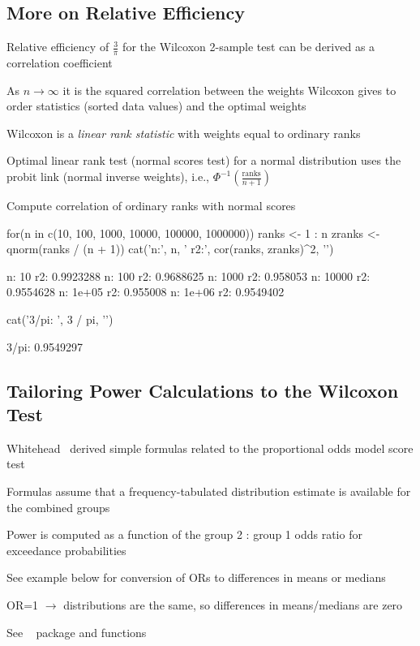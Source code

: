 \subsection{More on Relative Efficiency}
\bi
\item Relative efficiency of $\frac{3}{\pi}$ for the Wilcoxon 2-sample test can be derived as a correlation coefficient
\item As $n \rightarrow \infty$ it is the squared correlation between the weights Wilcoxon gives to order statistics (sorted data values) and the optimal weights
\item Wilcoxon is a \emph{linear rank statistic} with weights equal to ordinary ranks
\item Optimal linear rank test (normal scores test) for a normal distribution uses the probit link (normal inverse weights), i.e., $\Phi^{-1}(\frac{\textrm{ranks}}{n+1})$
\item Compute correlation of ordinary ranks with normal scores
\begin{Schunk}
\begin{Sinput}
for(n in c(10, 100, 1000, 10000, 100000, 1000000)) {
  ranks  <- 1 : n
  zranks <- qnorm(ranks / (n + 1))
  cat('n:', n, '  r2:', cor(ranks, zranks)^2, '\n')
}
\end{Sinput}
\begin{Soutput}
n: 10   r2: 0.9923288 
n: 100   r2: 0.9688625 
n: 1000   r2: 0.958053 
n: 10000   r2: 0.9554628 
n: 1e+05   r2: 0.955008 
n: 1e+06   r2: 0.9549402 
\end{Soutput}
\begin{Sinput}
cat('3/pi: ', 3 / pi, '\n')
\end{Sinput}
\begin{Soutput}
3/pi:  0.9549297 
\end{Soutput}
\end{Schunk}
\ei

\subsection{Tailoring Power Calculations to the Wilcoxon Test}
\bi
\item Whitehead~\cite{whi93sam} derived simple formulas related to the proportional odds model score test
\item Formulas assume that a frequency-tabulated distribution estimate is available for the combined groups
\item Power is computed as a function of the group 2 : group 1 odds ratio for exceedance probabilities
\item See example below for conversion of ORs to differences in means or medians
 \bi
 \item OR=1 $\rightarrow$ distributions are the same, so differences in means/medians are zero
 \ei
\item See \R\  package  and  functions
\ei

